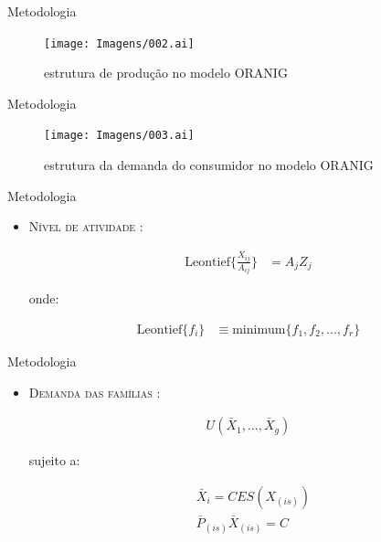 \documentclass[10pt]{sintefbeamer}
\begin{document}
\begin{frame}{Metodologia}
	\begin{figure}
		\centering
		\texttt{[image: Imagens/002.ai]}
		\caption{estrutura de produção no modelo ORANIG}
		\footnotesize
		\vspace{-0.2cm}
	\end{figure}
\end{frame}

\begin{frame}{Metodologia}
	\begin{figure}
		\centering
		\texttt{[image: Imagens/003.ai]}
		\caption{estrutura da demanda do consumidor no modelo ORANIG}
		\footnotesize
		\vspace{-0.2cm}
	\end{figure}
\end{frame}

\begin{frame}{Metodologia}
	\begin{itemize}
		\item \textsc{Nível de atividade} \cite{dixon82}:
		
		\begin{align*}
			\text{Leontief} \{\frac{X_{ij}}{A_{ij}}\} & = A_jZ_j
		\end{align*}
		
		onde:
		
		\begin{align*}
			\text{Leontief} \{f_i\}                   & \equiv \text{minimum} \{f_1, f_2, ..., f_r\}
		\end{align*}
	\end{itemize}
\end{frame}

\begin{frame}{Metodologia}
	\begin{itemize}
		\item \textsc{Demanda das famílias} \cite{dixon82}:
		
		\begin{align*}
			U(\bar{X}_1, ..., \bar{X}_g)
		\end{align*}
		
		sujeito a:
		
		\begin{align*}
			&\bar{X}_i = CES(X_{(is)}) \\
			&\bar{P}_{(is)}\bar{X}_{(is)} = C
		\end{align*}
	\end{itemize}
\end{frame}
\end{document}
